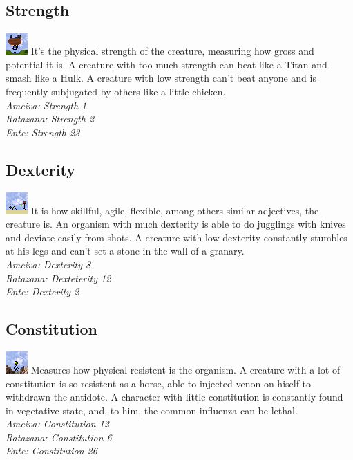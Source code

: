\documentclass[ letterpaper,12pt]{article}
\begin{document}
\subsection{Strength}
\includegraphics{../data/skills/Img/forca.png}
It's the physical strength of the creature, measuring how gross and potential
it is. A creature with too much strength can beat like a Titan and smash like a
Hulk. A creature with low strength can't beat anyone and is frequently
subjugated by others like a little chicken.\\ 
{\it Ameiva: Strength 1\\
Ratazana: Strength 2\\
Ente: Strength 23\\}

\subsection{Dexterity}
\includegraphics{../data/skills/Img/destreza.png}
It is how skillful, agile, flexible, among others similar adjectives, the
creature is. An organism with much dexterity is able to do jugglings with
knives and deviate easily from shots. A creature with low dexterity constantly
stumbles at his legs and can't set a stone in the wall of a granary.\\
{\it Ameiva: Dexterity 8\\
Ratazana: Dexteterity 12\\
Ente: Dexterity 2}

\subsection{Constitution}
\includegraphics{../data/skills/Img/constituicao.png}
Measures how physical resistent is the organism. A creature with a lot of
constitution is so resistent as a horse, able to injected venon on hiself to
withdrawn the antidote. A character with little constitution is constantly
found in vegetative state, and, to him, the common influenza can be lethal.\\
{\it Ameiva: Constitution 12\\
Ratazana: Constitution 6\\
Ente: Constitution 26}
\end{document}
